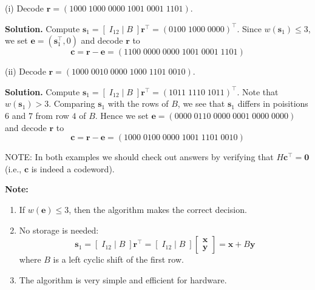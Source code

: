 \begin{exbox}
    \begin{example}
        $ \; $

        (i) Decode $ \bm{r}=(1000\; 1000\; 0000\; 1001\; 0001\; 1101) $.

        \textbf{Solution.} Compute $ \bm{s}_1=\left[ \; I_{12}\mid B \; \right]\bm{r}^\top=
            (0100\; 1000\; 0000)^\top $. Since $ w(\bm{s}_1)\leqslant 3 $, we set
        $ \bm{e}=(\bm{s}_1^\top,0) $ and decode $ \bm{r} $ to
        \[ \bm{c}=\bm{r}-\bm{e}=(1100\; 0000\; 0000\; 1001\; 0001\; 1101) \]

        (ii) Decode $ \bm{r}=(1000\; 0010\; 0000\; 1000\; 1101\; 0010) $.

        \textbf{Solution.} Compute $ \bm{s}_1=\left[ \; I_{12}\mid B \; \right]\bm{r}^\top=
            (1011\; 1110\; 1011)^\top $. Note that $ w(\bm{s}_1)>3 $. Comparing $ \bm{s}_1 $
        with the rows of $ B $, we see that $ \bm{s}_1 $ differs in poisitions $ 6 $
        and $ 7 $ from row $ 4 $ of $ B $. Hence we set $ \bm{e}=(0000\; 0110\; 0000\; 0001\; 0000\; 0000) $
        and decode $ \bm{r} $ to
        \[ \bm{c}=\bm{r}-\bm{e}=(1000\; 0100\; 0000\; 1001\; 1101\; 0010) \]

        NOTE: In both examples we should check out answers by verifying that $ H\bm{c}^\top=\bm{0} $
        (i.e., $ \bm{c} $ is indeed a codeword).
    \end{example}
\end{exbox}

\textbf{Note:}
\begin{enumerate}[(1)]
    \item If $ w(\bm{e})\leqslant 3 $, then the algorithm makes the correct decision.
    \item No storage is needed:
          \[ \bm{s}_1=\left[ \; I_{12}\mid B\; \right]\bm{r}^\top=\left[ \; I_{12}\mid B\; \right]
              \begin{bmatrix}
                  \bm{x} \\
                  \bm{y}
              \end{bmatrix}=\bm{x}+B\bm{y} \]
          where $ B $ is a left cyclic shift of the first row.
    \item The algorithm is very simple and efficient for hardware.
\end{enumerate}

